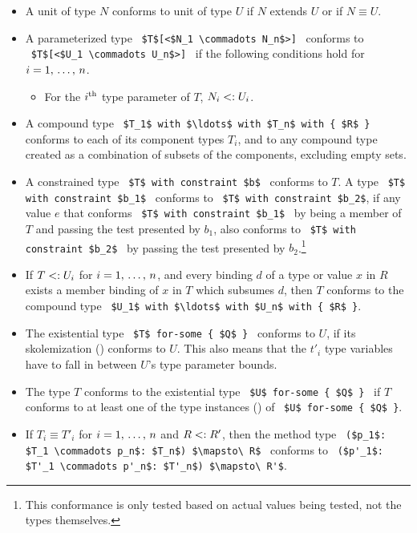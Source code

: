 \begin{itemize}
\item
A unit of type $N$ conforms to unit of type $U$ if $N$ extends $U$ or if $N \equiv U$. 

\item
A parameterized type ~\lstinline!$T$[<$N_1 \commadots N_n$>]!~ conforms to ~\lstinline!$T$[<$U_1 \commadots U_n$>]!~ if the following conditions hold for $i = 1 ,\, \ldots ,\, n$.
\begin{itemize}
\item For the $i^{\mbox{\scriptsize th}}$ type parameter of $T$, $N_i <: U_i$.
\end{itemize}

\item 
A compound type ~\lstinline!$T_1$ with $\ldots$ with $T_n$ with { $R$ }!~ conforms to each of its component types $T_i$, and to any compound type created as a combination of subsets of the components, excluding empty sets. 

\item
A constrained type ~\lstinline!$T$ with constraint $b$!~ conforms to $T$. A type ~\lstinline!$T$ with constraint $b_1$!~ conforms to ~\lstinline!$T$ with constraint $b_2$!, if any value $e$ that conforms ~\lstinline!$T$ with constraint $b_1$!~ by being a member of $T$ and passing the test presented by $b_1$, also conforms to ~\lstinline!$T$ with constraint $b_2$!~ by passing the test presented by $b_2$.\footnote{This conformance is only tested based on actual values being tested, not the types themselves.}

\item 
If $T <: U_i$ for $i = 1 ,\, \ldots ,\, n$, and every binding $d$ of a type or value $x$ in $R$ exists a member binding of $x$ in $T$ which subsumes $d$, then $T$ conforms to the compound type ~\lstinline!$U_1$ with $\ldots$ with $U_n$ with { $R$ }!. 

\item
The existential type ~\lstinline!$T$ for-some { $Q$ }!~ conforms to $U$, if its skolemization () conforms to $U$. This also means that the $t'_i$ type variables have to fall in between $U$'s type parameter bounds. 

\item
The type $T$ conforms to the existential type ~\lstinline!$U$ for-some { $Q$ }!~ if $T$ conforms to at least one of the type instances () of ~\lstinline!$U$ for-some { $Q$ }!. 

\item
If $T_i \equiv T'_i$ for $i = 1 ,\, \ldots ,\, n$ and $R <: R'$, then the method type ~\lstinline!($p_1$: $T_1 \commadots p_n$: $T_n$) $\mapsto\ R$!~ conforms to ~\lstinline!($p'_1$: $T'_1 \commadots p'_n$: $T'_n$) $\mapsto\ R'$!. 


\end{itemize}
